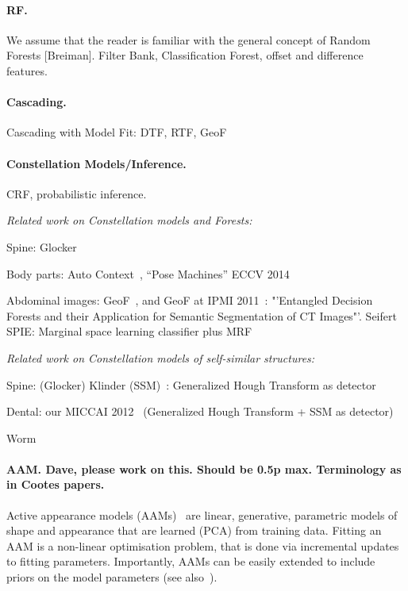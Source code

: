 \documentclass[10pt,twocolumn,letterpaper]{article}
\begin{document}
\paragraph{RF. }
We assume that the reader is familiar with the general concept of Random Forests [Breiman]. Filter Bank, Classification Forest, offset and difference features. 

\paragraph{Cascading. }

Cascading with Model Fit: DTF, RTF, GeoF

\paragraph{Constellation Models/Inference. }
CRF, probabilistic inference.

\emph{Related work on Constellation models and Forests: }

Spine: Glocker~\cite{Glocker2013}

Body parts: Auto Context~\cite{AutoContext2008}, "`Pose Machines"' ECCV 2014~\cite{PoseMachinesECCV2014}

Abdominal images: GeoF~\cite{GeoForests2013}, and GeoF at IPMI 2011~\cite{CriminisiAbdominalIPMI2011}: "'Entangled Decision Forests and their Application for Semantic Segmentation of CT Images"'. Seifert SPIE: Marginal space learning classifier plus MRF~\cite{SeifertAnatomicalSPIE2009} 

\emph{Related work on Constellation models of self-similar structures: }

Spine: (Glocker) Klinder (SSM)~\cite{Klinder2009471}: Generalized Hough Transform as detector

Dental: our MICCAI 2012~\cite{TeethMICCAI2012} (Generalized Hough Transform + SSM as detector)

Worm~\cite{WormMiccai2014}


\paragraph{AAM. Dave, please work on this. Should be 0.5p max. Terminology as in Cootes papers.}
Active appearance models (AAMs)~\cite{CootesAAM2001} are linear, generative, parametric models of shape and appearance that are learned (PCA) from training data.  Fitting an AAM is a non-linear optimisation problem, that is done via incremental updates to fitting parameters.  Importantly, AAMs can be easily extended to include priors on the model parameters (see also~\cite{BakerAAM2004}).  
\end{document}
